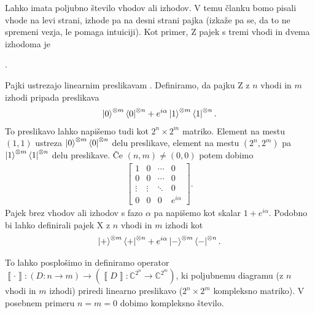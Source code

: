 \documentclass[mat1]{fmfdelo}
\newcommand{\C}{\mathbb C}
\newcommand{\interpret}[1]{\left\llbracket #1 \right\rrbracket}
\begin{document}
Lahko imata poljubno število vhodov ali izhodov. V temu članku bomo pisali vhode na levi strani, izhode pa na desni strani pajka (izkaže pa se, da to ne spremeni vezja, le pomaga intuiciji). Kot primer, Z pajek s tremi vhodi in dvema izhodoma je
\begin{center}
  .
\end{center}
Pajki ustrezajo linearnim preslikavam \cite[poglavje 1.1]{Backens}. Definiramo, da pajku Z z \(n\) vhodi in \(m\) izhodi pripada preslikava
\begin{align*}
    \ket{0}^{\otimes m} \bra{0}^{\otimes n} + e^{i\alpha}\ket{1}^{\otimes m} \bra{1}^{\otimes n}.
\end{align*}
To preslikavo lahko napišemo tudi kot \(2^n\times 2^m\) matriko. Element na mestu \((1,1)\) ustreza \(\ket{0}^{\otimes m} \bra{0}^{\otimes n}\) delu preslikave, element na mestu \((2^n, 2^m)\) pa \(\ket{1}^{\otimes m} \bra{1}^{\otimes n}\) delu preslikave. Če \((n,m)\neq (0,0)\) potem dobimo
\begin{align*}
    \begin{bmatrix}
        1 & 0 & \cdots & 0 \\
        0 & 0 & \cdots & 0 \\
        \vdots & \vdots & \ddots & 0 \\
        0 & 0 & 0 & e^{i\alpha} 
        \end{bmatrix}.
\end{align*}
Pajek brez vhodov ali izhodov s fazo \(\alpha\) pa napišemo kot skalar \(1+e^{i\alpha}\).
Podobno bi lahko definirali pajek X z \(n\) vhodi in \(m\) izhodi \cite[Poglavje 3.1]{workingcs} kot
\begin{align*}
    \ket{+}^{\otimes m} \bra{+}^{\otimes n} + e^{i\alpha}\ket{-}^{\otimes m} \bra{-}^{\otimes n}.
\end{align*}

To lahko posplošimo in definiramo operator \(\interpret{\cdot}: (D:n\to m)\to (\interpret{D}: \C^{2^n} \to \C^{2^m})\), ki poljubnemu diagramu (z \(n\) vhodi in \(m\) izhodi) priredi linearno preslikavo (\(2^n\times 2^m\) kompleksno matriko). V posebnem primeru \(n=m=0\) dobimo kompleksno število.
\end{document}

